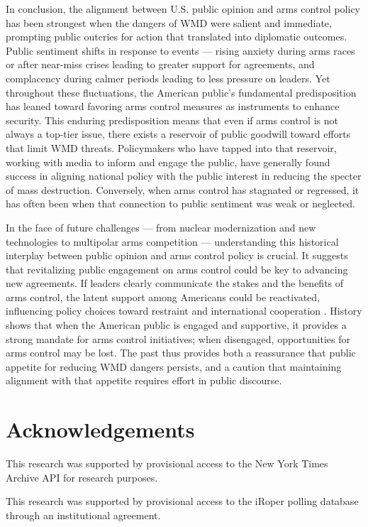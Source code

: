\documentclass[11,5 pt]{article}
\begin{document}
    In conclusion, the alignment between U.S. public opinion and arms control policy has been strongest when the dangers of WMD were salient and immediate, prompting public outcries for action that translated into diplomatic outcomes. Public sentiment shifts in response to events — rising anxiety during arms races or after near-miss crises leading to greater support for agreements, and complacency during calmer periods leading to less pressure on leaders. Yet throughout these fluctuations, the American public’s fundamental predisposition has leaned toward favoring arms control measures as instruments to enhance security. This enduring predisposition means that even if arms control is not always a top-tier issue, there exists a reservoir of public goodwill toward efforts that limit WMD threats. Policymakers who have tapped into that reservoir, working with media to inform and engage the public, have generally found success in aligning national policy with the public interest in reducing the specter of mass destruction. Conversely, when arms control has stagnated or regressed, it has often been when that connection to public sentiment was weak or neglected.  
    
    In the face of future challenges — from nuclear modernization and new technologies to multipolar arms competition — understanding this historical interplay between public opinion and arms control policy is crucial. It suggests that revitalizing public engagement on arms control could be key to advancing new agreements. If leaders clearly communicate the stakes and the benefits of arms control, the latent support among Americans could be reactivated, influencing policy choices toward restraint and international cooperation \cite{GlobalAffairs2017}. History shows that when the American public is engaged and supportive, it provides a strong mandate for arms control initiatives; when disengaged, opportunities for arms control may be lost. The past thus provides both a reassurance that public appetite for reducing WMD dangers persists, and a caution that maintaining alignment with that appetite requires effort in public discourse.
    

\cite{ArmsControlColdWar}\cite{BritannicaLTBT}\cite{Carnegie1999}\cite{CDI2002}\cite{ArmsControlColdWar}\cite{ChicagoCouncil2017}\cite{Graham1989}\cite{FifthEstate1982}


\section{Acknowledgements}

    This research was supported by provisional access to the New York Times Archive API for research purposes.
    
    This research was supported by provisional access to the iRoper polling database through an institutional agreement.


\newpage

\printbibliography
\end{document}
